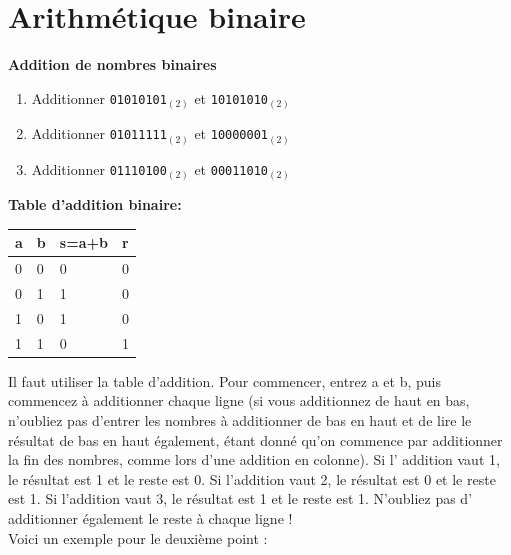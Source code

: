 \section{Arithmétique binaire}

\begin{Exercice}[15 minutes] \textbf{Addition de nombres binaires}
    \begin{enumerate}
        \item Additionner \lstinline{01010101}$_{(2)}$ et \lstinline{10101010}$_{(2)}$
        \item Additionner \lstinline{01011111}$_{(2)}$ et \lstinline{10000001}$_{(2)}$
        \item Additionner \lstinline{01110100}$_{(2)}$ et \lstinline{00011010}$_{(2)}$
    \end{enumerate}
    \begin{conseil}
\textbf{Table d'addition binaire:}\\
        \begin{tabular}{| C{0.1\textwidth} | C{0.1\textwidth} | C{0.1\textwidth} | C{0.1\textwidth} |} 
            \hline
            \textbf{a} & \textbf{b} & \textbf{s=a+b} & \textbf{r}\\ [0.5ex]
             & 0 & 0 & 0 \\ [0.5ex] 
             & 1 & 1 & 0 \\ [0.5ex] 
             & 0 & 1 & 0 \\ [0.5ex] 
             & 1 & 0 & 1 \\ [0.5ex] 
            \hline
        \end{tabular}
    \end{conseil}
    
    \begin{solution}
        Il faut utiliser la table d'addition. Pour commencer, entrez a et b, puis commencez à additionner chaque ligne (si vous additionnez de haut en bas, n'oubliez pas d'entrer les nombres à additionner de bas en haut et de lire le résultat de bas en haut également, étant donné qu'on commence par additionner la fin des nombres, comme lors d'une addition en colonne). Si l' addition vaut 1, le résultat est 1 et le reste est 0. Si l'addition vaut 2, le résultat est 0 et le reste est 1. Si l'addition vaut 3, le résultat est 1 et le reste est 1. N'oubliez pas d' additionner également le reste à chaque ligne ! \\
        
Voici un exemple pour le deuxième point : \\


\end{solution}
\end{Exercice}
